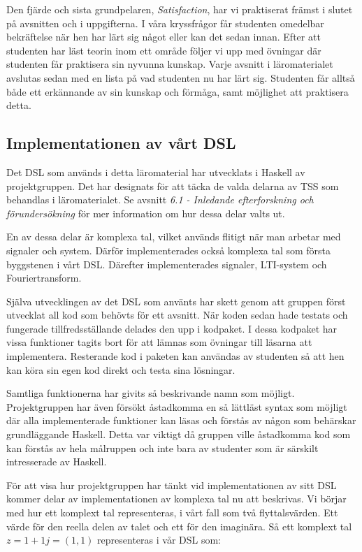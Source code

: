 \documentclass[]{article}
\begin{document}
Den fjärde och sista grundpelaren, \textit{Satisfaction}, har vi
praktiserat främst i slutet på avsnitten och i uppgifterna. I våra
kryssfrågor får studenten omedelbar bekräftelse när hen har lärt sig
något eller kan det sedan innan. Efter att studenten har läst teorin
inom ett område följer vi upp med övningar där studenten får
praktisera sin nyvunna kunskap. Varje avsnitt i läromaterialet
avslutas sedan med en lista på vad studenten nu har lärt
sig. Studenten får alltså både ett erkännande av sin kunskap och
förmåga, samt möjlighet att praktisera detta.

\subsection{Implementationen av vårt DSL}
\label{sec:implDSL}
Det DSL som används i detta läromaterial har utvecklats i Haskell av
projektgruppen. Det har designats för att täcka de valda delarna av
TSS som behandlas i läromaterialet. Se avsnitt 
\textit{6.1 - Inledande efterforskning och förundersökning} för mer 
information om hur dessa delar valts ut.

En av dessa delar är komplexa tal, vilket används flitigt när man
arbetar med signaler och system. Därför implementerades också komplexa
tal som första byggstenen i vårt DSL. Därefter implementerades
signaler, LTI-system och Fouriertransform.

Själva utvecklingen av det DSL som använts har skett genom att gruppen
först utvecklat all kod som behövts för ett avsnitt. När koden sedan
hade testats och fungerade tillfredsställande delades den upp i
kodpaket. I dessa kodpaket har vissa funktioner tagits bort för att
lämnas som övningar till läsarna att implementera. Resterande kod i
paketen kan användas av studenten så att hen kan köra sin egen kod
direkt och testa sina lösningar.

Samtliga funktionerna har givits så beskrivande namn som
möjligt. Projektgruppen har även försökt åstadkomma en så lättläst
syntax som möjligt där alla implementerade funktioner kan läsas och
förstås av någon som behärskar grundläggande Haskell. Detta var
viktigt då gruppen ville åstadkomma kod som kan förstås av hela
målruppen och inte bara av studenter som är särskilt intresserade av
Haskell.


För att visa hur projektgruppen har tänkt vid implementationen av sitt
DSL kommer delar av implementationen av komplexa tal nu att
beskrivas. Vi börjar med hur ett komplext tal representeras, i vårt
fall som två flyttalsvärden. Ett värde för den reella delen av talet
och ett för den imaginära. Så ett komplext tal
\(z = 1 + 1j = (1,1) \) representeras i vår DSL som:
\end{document}
